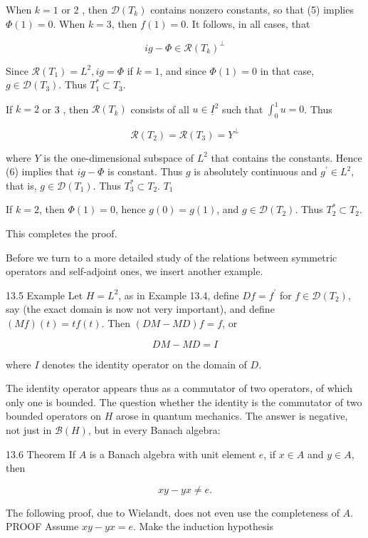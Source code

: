 \documentclass[10pt]{article}
\begin{document}
When $k=1$ or 2 , then $\mathscr{D}\left(T_{k}\right)$ contains nonzero constants, so that (5) implies $\Phi(1)=0$. When $k=3$, then $f(1)=0$. It follows, in all cases, that

$$
i g-\Phi \in \mathscr{R}\left(T_{k}\right)^{\perp}
$$

Since $\mathscr{R}\left(T_{1}\right)=L^{2}, i g=\Phi$ if $k=1$, and since $\Phi(1)=0$ in that case, $g \in \mathscr{D}\left(T_{3}\right)$. Thus $T_{1}^{*} \subset T_{3}$.

If $k=2$ or 3 , then $\mathscr{R}\left(T_{k}\right)$ consists of all $u \in \underline{I}^{2}$ such that $\int_{0}^{1} u=0$. Thus

$$
\mathscr{R}\left(T_{2}\right)=\mathscr{R}\left(T_{3}\right)=Y^{\perp}
$$

where $Y$ is the one-dimensional subspace of $L^{2}$ that contains the constants. Hence (6) implies that $i g-\Phi$ is constant. Thus $g$ is absolutely continuous and $g^{\prime} \in L^{2}$, that is, $g \in \mathscr{D}\left(T_{1}\right)$. Thus $T_{3}^{*} \subset T_{2}$. $T_{1}$

If $k=2$, then $\Phi(1)=0$, hence $g(0)=g(1)$, and $g \in \mathscr{D}\left(T_{2}\right)$. Thus $T_{2}^{*} \subset T_{2}$.

This completes the proof.

Before we turn to a more detailed study of the relations between symmetric operators and self-adjoint ones, we insert another example.

13.5 Example Let $H=L^{2}$, as in Example 13.4, define $D f=f^{\prime}$ for $f \in \mathscr{D}\left(T_{2}\right)$, say (the exact domain is now not very important), and define $(M f)(t)=t f(t)$. Then $(D M-M D) f=f$, or

$$
D M-M D=I
$$

where $I$ denotes the identity operator on the domain of $D$.

The identity operator appears thus as a commutator of two operators, of which only one is bounded. The question whether the identity is the commutator of two bounded operators on $H$ arose in quantum mechanics. The answer is negative, not just in $\mathscr{B}(H)$, but in every Banach algebra:

13.6 Theorem If $A$ is a Banach algebra with unit element $e$, if $x \in A$ and $y \in A$, then

$$
x y-y x \neq e .
$$

The following proof, due to Wielandt, does not even use the completeness of $A$. PROOF Assume $x y-y x=e$. Make the induction hypothesis
\end{document}
